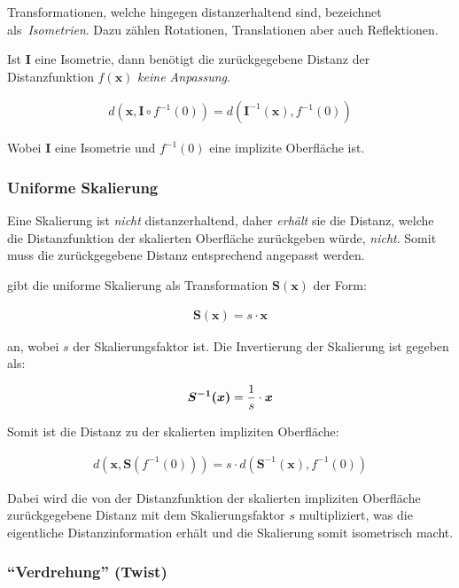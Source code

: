 Transformationen, welche hingegen distanzerhaltend sind,
bezeichnet~\cite{hart_sphere_1994} als~\textit{Isometrien}. Dazu zählen
Rotationen, Translationen aber auch Reflektionen.

Ist $\bm{I}$ eine Isometrie, dann benötigt die zurückgegebene Distanz der
Distanzfunktion $f(\bm{x})$ \textit{keine Anpassung}.

\begin{gather}
    d(\bm{x}, \bm{I} \circ f^{-1}(0)) = d(\bm{I}^{-1}(\bm{x}), f^{-1}(0))
\end{gather}

Wobei $\bm{I}$ eine Isometrie und $f^{-1}(0)$ eine implizite Oberfläche ist.

\subsubsection{Uniforme Skalierung}
\label{ssubsec:implicit_surfaces_ops_scaling}

Eine Skalierung ist \textit{nicht} distanzerhaltend, daher \textit{erhält} sie die Distanz, welche die
Distanzfunktion der skalierten Oberfläche zurückgeben würde, \textit{nicht}.
Somit muss die zurückgegebene Distanz entsprechend angepasst werden.

\cite{hart_sphere_1994} gibt die uniforme Skalierung als Transformation $\bm{S(x)}$  der Form:

\begin{gather}
    \bm{S(x)} = s \cdot \bm{x}
\end{gather}

an, wobei $s$ der Skalierungsfaktor ist. Die Invertierung der Skalierung ist gegeben als:

\begin{gather}
    \bm{S^{-1}(x)} = {1 \over s} \cdot \bm{x}
\end{gather}

Somit ist die Distanz zu der skalierten impliziten Oberfläche:

\begin{gather}
    d(\bm{x}, \bm{S}(f^{-1}(0))) = s \cdot d(\bm{S}^{-1}(\bm{x}), f^{-1}(0))
\end{gather}

Dabei wird die von der Distanzfunktion der skalierten impliziten Oberfläche
zurückgegebene Distanz mit dem Skalierungsfaktor $s$ multipliziert, was die
eigentliche Distanzinformation erhält und die Skalierung somit isometrisch
macht.

\subsubsection{``Verdrehung'' (Twist)}
\label{ssubsec:implicit_surfaces_ops_twist}

